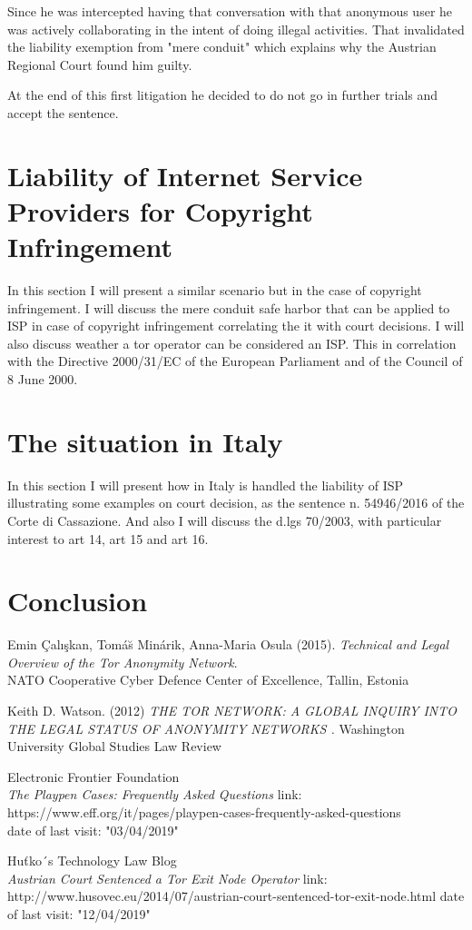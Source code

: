 \documentclass[runningheads,a4paper]{llncs}
\begin{document}
Since he was intercepted having that conversation with that anonymous user he was actively collaborating in the intent of doing illegal activities. That invalidated the liability exemption from "mere conduit" which explains why the Austrian Regional Court found him guilty.

At the end of this first litigation he decided to do not go in further trials and accept the sentence.


\section{Liability of Internet Service Providers for Copyright Infringement}
In this section I will present a similar scenario but in the case of copyright infringement. I will discuss the mere conduit safe harbor that can be applied to ISP in case of copyright infringement correlating the it with court decisions. I will also discuss weather a tor operator can be considered an ISP. This in correlation with the Directive 2000/31/EC of the European Parliament and of the Council of 8 June 2000.

\section{The situation in Italy}
In this section I will present how in Italy is handled the liability of ISP illustrating some examples on court decision, as the sentence n. 54946/2016 of the Corte di Cassazione. And also I will discuss the d.lgs 70/2003, with particular interest to art 14, art 15 and art 16.

\section{Conclusion}
\blindtext[3]



\begin{thebibliography}{9}

Emin \c{C}alı\c{s}kan, Tom\'{a}\u{s} Min\'{a}rik, Anna-Maria Osula (2015).
\textit{Technical and Legal Overview of the 
Tor Anonymity Network}.\\
NATO Cooperative Cyber Defence Center of 
Excellence, Tallin, Estonia

    Keith D. Watson. (2012)
    \textit{ THE TOR NETWORK: A GLOBAL INQUIRY INTO THE LEGAL STATUS OF ANONYMITY NETWORKS . }
    Washington University Global Studies Law Review

    Electronic Frontier Foundation\\
    \textit{The Playpen Cases: Frequently Asked Questions}
    link: https://www.eff.org/it/pages/playpen-cases-frequently-asked-questions\\
    date of last visit: "03/04/2019"
    
    Huťko´s Technology Law Blog\\
    \textit{Austrian Court Sentenced a Tor Exit Node Operator}
    link:     http://www.husovec.eu/2014/07/austrian-court-sentenced-tor-exit-node.html
    date of last visit: "12/04/2019"

\end{thebibliography}
\end{document}
